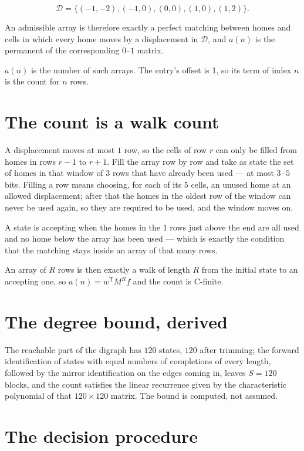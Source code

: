 \documentclass[11pt]{article}
\theoremstyle{definition}
\begin{document}
\[\mathcal{D} = \{(-1,-2), (-1,0), (0,0), (1,0), (1,2)\}.\]

An admissible array is therefore exactly a perfect matching between homes and cells in which every home moves by a displacement in $\mathcal{D}$, and $a(n)$ is the permanent of the corresponding $0$--$1$ matrix.

$a(n)$ is the number of such arrays. The entry's offset is 1, so its term of index $n$ is the count for $n$ rows.

\section{The count is a walk count}

A displacement moves at most $1$ row, so the cells of row $r$ can only be filled from homes in rows $r-1$ to $r+1$. Fill the array row by row and take as state the set of homes in that window of $3$ rows that have already been used --- at most $3\cdot5$ bits. Filling a row means choosing, for each of its $5$ cells, an unused home at an allowed displacement; after that the homes in the oldest row of the window can never be used again, so they are required to be used, and the window moves on.

A state is accepting when the homes in the $1$ rows just above the end are all used and no home below the array has been used --- which is exactly the condition that the matching stays inside an array of that many rows.

An array of $R$ rows is then exactly a walk of length $R$ from the initial state to an accepting one, so $a(n) = w^{\mathsf T}M^{R}f$ and the count is C-finite.

\section{The degree bound, derived}

The reachable part of the digraph has $120$ states, $120$ after trimming; the forward identification of states with equal numbers of completions of every length, followed by the mirror identification on the edges coming in, leaves $S = 120$ blocks, and the count satisfies the linear recurrence given by the characteristic polynomial of that $120\times120$ matrix. The bound is computed, not assumed.

\section{The decision procedure}
\end{document}
